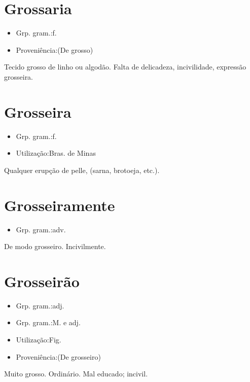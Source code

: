 \section{Grossaria}
\begin{itemize}
\item {Grp. gram.:f.}
\end{itemize}
\begin{itemize}
\item {Proveniência:(De \textunderscore grosso\textunderscore )}
\end{itemize}
Tecido grosso de linho ou algodão.
Falta de delicadeza, incivilidade, expressão grosseira.
\section{Grosseira}
\begin{itemize}
\item {Grp. gram.:f.}
\end{itemize}
\begin{itemize}
\item {Utilização:Bras. de Minas}
\end{itemize}
Qualquer erupção de pelle, (sarna, brotoeja, etc.).
\section{Grosseiramente}
\begin{itemize}
\item {Grp. gram.:adv.}
\end{itemize}
De modo grosseiro.
Incivilmente.
\section{Grosseirão}
\begin{itemize}
\item {Grp. gram.:adj.}
\end{itemize}
\begin{itemize}
\item {Grp. gram.:M.  e  adj.}
\end{itemize}
\begin{itemize}
\item {Utilização:Fig.}
\end{itemize}
\begin{itemize}
\item {Proveniência:(De \textunderscore grosseiro\textunderscore )}
\end{itemize}
Muito grosso.
Ordinário.
Mal educado; incivil.
